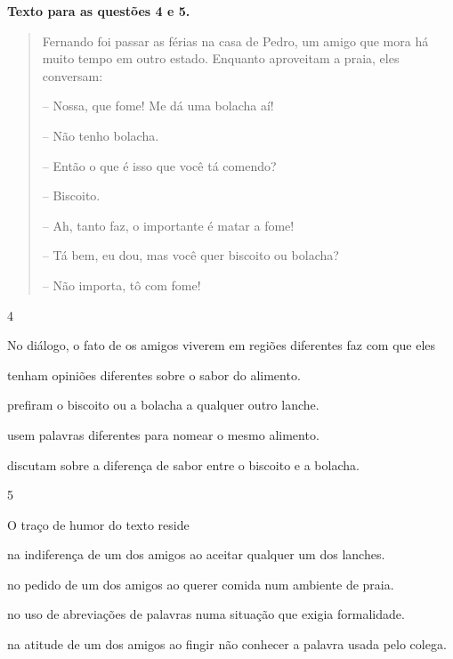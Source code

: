 \textbf{Texto para as questões 4 e 5.}

\begin{quote}
Fernando foi passar as férias na casa de Pedro, um amigo que mora há
muito tempo em outro
estado. Enquanto aproveitam a praia, eles conversam:

-- Nossa, que fome! Me dá uma bolacha aí!

-- Não tenho bolacha.

-- Então o que é isso que você tá comendo?

-- Biscoito.

-- Ah, tanto faz, o importante é matar a fome!

-- Tá bem, eu dou, mas você quer biscoito ou bolacha?

-- Não importa, tô com fome!
\end{quote}


\num{4}

No diálogo, o fato de os amigos viverem em regiões diferentes faz com
que eles

\begin{escolha}
\item tenham opiniões diferentes sobre o sabor do alimento.

\item prefiram o biscoito ou a bolacha a qualquer outro lanche.

\item usem palavras diferentes para nomear o mesmo alimento.

\item discutam sobre a diferença de sabor entre o biscoito e a bolacha.
\end{escolha}

\num{5}

O traço de humor do texto reside

\begin{escolha}
\item na indiferença de um dos amigos ao aceitar qualquer um dos lanches.

\item no pedido de um dos amigos ao querer comida num ambiente de praia.

\item no uso de abreviações de palavras numa situação que exigia
formalidade.

\item na atitude de um dos amigos ao fingir não conhecer a palavra usada
pelo colega.
\end{escolha}

